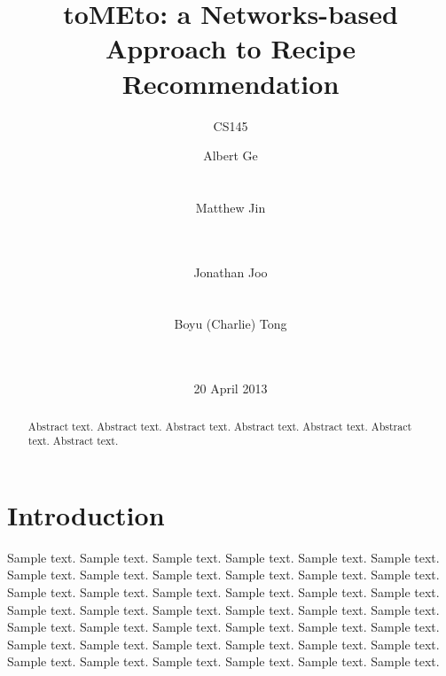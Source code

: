 \documentclass{acm_proc_article-sp}
\begin{document}
\title{toMEto: a Networks-based Approach to Recipe Recommendation}
\subtitle{CS145}


\author{
\alignauthor
Albert Ge\\
       \\
       \\
\alignauthor
Matthew Jin\\
       \\
       \\
\and %
\alignauthor
Jonathan Joo\\
       \\
       \\
\alignauthor
Boyu (Charlie) Tong\\
       \\
       \\
}

\date{20 April 2013}


\maketitle
\begin{abstract}
Abstract text. Abstract text. Abstract text. Abstract text. Abstract text. Abstract text. Abstract text. 
\end{abstract}




\section{Introduction}
Sample text. Sample text. Sample text. Sample text. Sample text. Sample text. 
Sample text. Sample text. Sample text. Sample text. Sample text. Sample text. 
Sample text. Sample text. Sample text. Sample text. Sample text. Sample text. 
Sample text. Sample text. Sample text. Sample text. Sample text. Sample text. 
Sample text. Sample text. Sample text. Sample text. Sample text. Sample text. 
Sample text. Sample text. Sample text. Sample text. Sample text. Sample text. 
Sample text. Sample text. Sample text. Sample text. Sample text. Sample text. 
\end{document}
